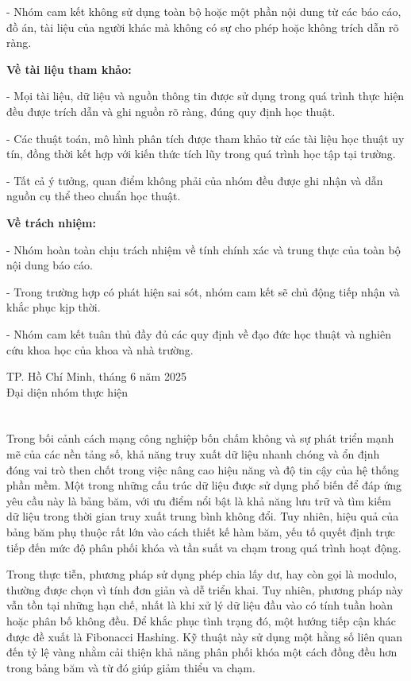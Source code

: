 \documentclass[12pt,a4paper]{report}
\begin{document}
- Nhóm cam kết không sử dụng toàn bộ hoặc một phần nội dung từ các báo cáo, đồ án, tài liệu của người khác mà không có sự cho phép hoặc không trích dẫn rõ ràng.

\textbf{Về tài liệu tham khảo:}

- Mọi tài liệu, dữ liệu và nguồn thông tin được sử dụng trong quá trình thực hiện đều được trích dẫn và ghi nguồn rõ ràng, đúng quy định học thuật.

- Các thuật toán, mô hình phân tích được tham khảo từ các tài liệu học thuật uy tín, đồng thời kết hợp với kiến thức tích lũy trong quá trình học tập tại trường.

- Tất cả ý tưởng, quan điểm không phải của nhóm đều được ghi nhận và dẫn nguồn cụ thể theo chuẩn học thuật.

\textbf{Về trách nhiệm:}

- Nhóm hoàn toàn chịu trách nhiệm về tính chính xác và trung thực của toàn bộ nội dung báo cáo.

- Trong trường hợp có phát hiện sai sót, nhóm cam kết sẽ chủ động tiếp nhận và khắc phục kịp thời.

- Nhóm cam kết tuân thủ đầy đủ các quy định về đạo đức học thuật và nghiên cứu khoa học của khoa và nhà trường.

\begin{flushright}
TP. Hồ Chí Minh, tháng 6 năm 2025\\
Đại diện nhóm thực hiện \\
\end{flushright}

\chapter*{}
\noindent \indent Trong bối cảnh cách mạng công nghiệp bốn chấm không và sự phát triển mạnh mẽ của các nền tảng số, khả năng truy xuất dữ liệu nhanh chóng và ổn định đóng vai trò then chốt trong việc nâng cao hiệu năng và độ tin cậy của hệ thống phần mềm. Một trong những cấu trúc dữ liệu được sử dụng phổ biến để đáp ứng yêu cầu này là bảng băm, với ưu điểm nổi bật là khả năng lưu trữ và tìm kiếm dữ liệu trong thời gian truy xuất trung bình không đổi. Tuy nhiên, hiệu quả của bảng băm phụ thuộc rất lớn vào cách thiết kế hàm băm, yếu tố quyết định trực tiếp đến mức độ phân phối khóa và tần suất va chạm trong quá trình hoạt động.

Trong thực tiễn, phương pháp sử dụng phép chia lấy dư, hay còn gọi là modulo, thường được chọn vì tính đơn giản và dễ triển khai. Tuy nhiên, phương pháp này vẫn tồn tại những hạn chế, nhất là khi xử lý dữ liệu đầu vào có tính tuần hoàn hoặc phân bố không đều. Để khắc phục tình trạng đó, một hướng tiếp cận khác được đề xuất là Fibonacci Hashing. Kỹ thuật này sử dụng một hằng số liên quan đến tỷ lệ vàng nhằm cải thiện khả năng phân phối khóa một cách đồng đều hơn trong bảng băm và từ đó giúp giảm thiểu va chạm.
\end{document}
